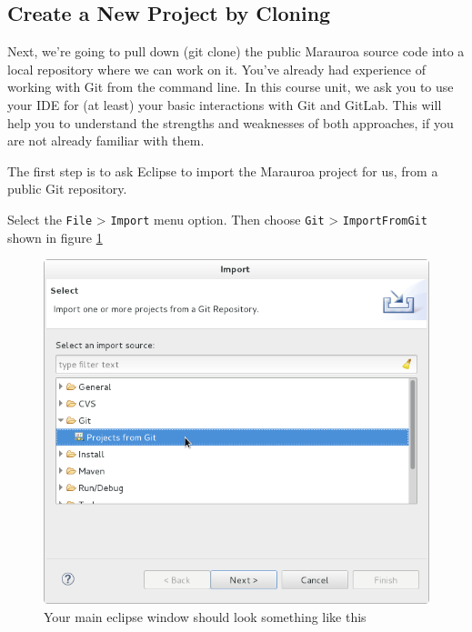 \documentclass[
]{book}
\begin{document}
\hypertarget{newproj}{%
\subsection{Create a New Project by Cloning}\label{newproj}}

Next, we're going to pull down (git clone) the public Marauroa source code into a local repository where we can work on it. You've already had experience of working with Git from the command line. In this course unit, we ask you to use your IDE for (at least) your basic interactions with Git and GitLab. This will help you to understand the strengths and weaknesses of both approaches, if you are not already familiar with them.

The first step is to ask Eclipse to import the Marauroa project for us, from a public Git repository.

Select the \texttt{File} \textgreater{} \texttt{Import} menu option. Then choose \texttt{Git} \textgreater{} \texttt{ImportFromGit} shown in figure \ref{fig:eclipseImportProjectFromGit-fig}

\begin{figure}

{\centering \includegraphics[width=1\linewidth]{images/1.4.eclipseImportProjectFromGit} 

}

\caption{Your main eclipse window should look something like this}\label{fig:eclipseImportProjectFromGit-fig}
\end{figure}
\end{document}

